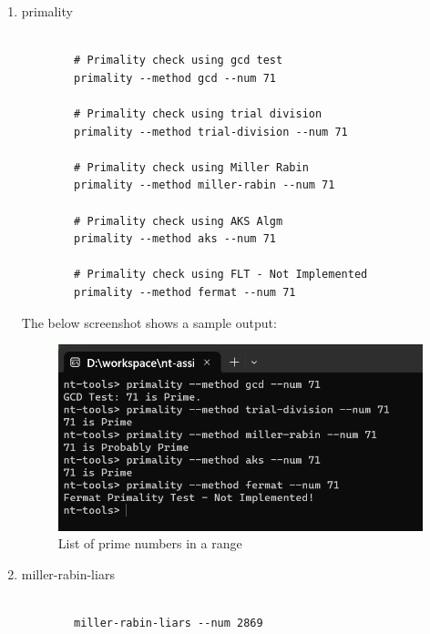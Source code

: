 \documentclass{article}
\begin{document}
\begin{enumerate}
        \item primality
        \begin{lstlisting}[style=DOS]

        # Primality check using gcd test
        primality --method gcd --num 71

        # Primality check using trial division
        primality --method trial-division --num 71

        # Primality check using Miller Rabin
        primality --method miller-rabin --num 71

        # Primality check using AKS Algm
        primality --method aks --num 71

        # Primality check using FLT - Not Implemented
        primality --method fermat --num 71
        \end{lstlisting}

        The below screenshot shows a sample output:
        \begin{figure}[H]
            \centering
            \includegraphics[scale=0.5]{primality.png}
            \caption{List of prime numbers in a range}
        \end{figure}

        \item miller-rabin-liars
        \begin{lstlisting}[style=DOS]

        miller-rabin-liars --num 2869
        \end{lstlisting}


\end{enumerate}
\end{document}
